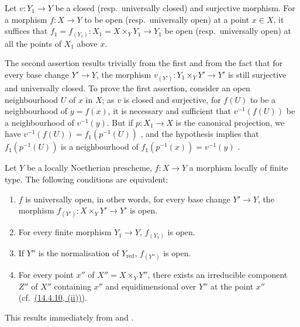 \begin{lemma}[14.4.8.1]
\label{IV.14.4.8.1}
Let $v:Y_1\to Y$ be a closed (resp.\ universally closed) and surjective morphism.
For a morphism $f:X\to Y$ to be open (resp.\ universally open) at a point $x\in X$, it suffices that $f_1=f_{(Y_1)}:X_1=X\times_Y Y_1\to Y_1$ be open (resp.\ universally open) at all the points of $X_1$ above $x$.
\end{lemma}

The second assertion results trivially from the first and from the fact that for every base change $Y'\to Y$, the morphism $v_{(Y')}:Y_1\times_Y Y'\to Y'$ is still surjective and universally closed.
To prove the first assertion, consider
an open neighbourhood $U$ of $x$ in $X$; as $v$ is closed and surjective, for $f(U)$ to be a neighbourhood of $y=f(x)$, it is necessary and sufficient that $v^{-1}(f(U))$ be a neighbourhood of $v^{-1}(y)$.
But if $p:X_1\to X$ is the canonical projection, we have $v^{-1}(f(U))=f_1(p^{-1}(U))$ , and the hypothesis implies that $f_1(p^{-1}(U))$ is a neighbourhood of $f_1(p^{-1}(x))=v^{-1}(y)$ .

\begin{corollary}[14.4.9]
\label{IV.14.4.9}
Let $Y$ be a locally Noetherian prescheme, $f:X\to Y$ a morphism locally of finite type.
The following conditions are equivalent:
\begin{enumerate}[label=\emph{\alph*)}]
  \item $f$ is universally open, in other words, for every base change $Y'\to Y$, the morphism $f_{(Y')}:X\times_Y Y'\to Y'$ is open.
  \item[\emph{a$'$)}] For every finite morphism $Y_1\to Y$, $f_{(Y_1)}$ is open.
  \item[\emph{a$''$)}] If $Y''$ is the normalisation of $Y_{\mathrm{red}}$, $f_{(Y'')}$ is open.
  \item For every point $x''$ of $X''=X\times_Y Y''$, there exists an irreducible component $Z''$ of $X''$ containing $x''$ and equidimensional over $Y''$ at the point $x''$ (cf.\ {\hyperlink{ega4.c04.item.14-4-10}{(14.4.10, (ii))}}).
\end{enumerate}
\end{corollary}

This results immediately from  and .


